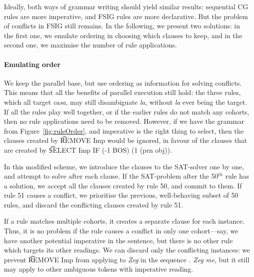 Ideally, both ways of grammar writing should yield similar results:
sequential CG rules are more imperative, and FSIG rules are more declarative.
But the problem of conflicts in FSIG still remains. 
In the following, we present two solutions: 
in the first one, we emulate ordering in choosing which clauses to keep, and in the second one, we maximise the number of rule applications. 



\paragraph{Emulating order} 

We keep the parallel base, but use ordering as information for solving conflicts.
This means that all the benefits of parallel execution still hold: the three rules, which all target \emph{casa}, may still disambiguate \emph{la}, without \emph{la} ever being the target.
If all the rules play well together, or if the earlier rules do not match any cohorts, 
then no rule applications need to be removed. 
However, if we have the grammar from Figure~\ref{fig:ruleOrder}, 
and imperative is the right thing to select, then the clauses created by 
\t{REMOVE Imp} would be ignored, in favour of the clauses that are created 
by \t{SELECT Imp IF (-1 BOS) (1 (prn obj))}.




In this modified scheme, we introduce the clauses to the SAT-solver one by one, 
and attempt to solve after each clause. If the SAT-problem after the 50$^{th}$ rule 
has a solution, we accept all the clauses created by rule 50, and commit to them.
If rule 51 causes a conflict, we prioritise the previous, well-behaving subset of
50 rules, and discard the conflicting clauses created by rule 51.

If a rule matches multiple cohorts, it creates a separate clause for each instance.
Thus, it is no problem if the rule causes a conflict in only one cohort---say, we 
have another potential imperative in the sentence, 
but there is no other rule which targets its other readings. 
We can discard only the conflicting instances: we prevent 
\t{REMOVE Imp} from applying to \emph{Zeg} in the sequence \emph{. Zeg me}, 
but it still may apply to other ambiguous tokens with imperative reading.


